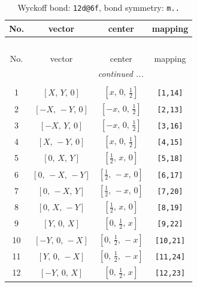 \documentclass[fleqn,8pt]{jsarticle}
\begin{document}
\begin{longtable}{cccc}
\caption{Wyckoff bond: {\tt 12d@6f}, bond symmetry: {\tt m..}}
 \\
 \hline \hline
No. & vector & center & mapping \\ \hline \endfirsthead

\multicolumn{3}{l}{\tablename\ \thetable{}} \\
 \hline \hline
No. & vector & center & mapping \\ \hline \endhead

 \hline \hline
\multicolumn{3}{r}{\footnotesize\it continued ...} \\ \endfoot

 \hline \hline
\multicolumn{3}{r}{} \\ \endlastfoot

1 & $\left[ X,\, Y,\, 0 \right]$ & $\left[ x,\, 0,\, \frac{1}{2} \right]$ & {\tt [1,14]} \\ \hline
2 & $\left[ - X,\, - Y,\, 0 \right]$ & $\left[ - x,\, 0,\, \frac{1}{2} \right]$ & {\tt [2,13]} \\ \hline
3 & $\left[ - X,\, Y,\, 0 \right]$ & $\left[ - x,\, 0,\, \frac{1}{2} \right]$ & {\tt [3,16]} \\ \hline
4 & $\left[ X,\, - Y,\, 0 \right]$ & $\left[ x,\, 0,\, \frac{1}{2} \right]$ & {\tt [4,15]} \\ \hline
5 & $\left[ 0,\, X,\, Y \right]$ & $\left[ \frac{1}{2},\, x,\, 0 \right]$ & {\tt [5,18]} \\ \hline
6 & $\left[ 0,\, - X,\, - Y \right]$ & $\left[ \frac{1}{2},\, - x,\, 0 \right]$ & {\tt [6,17]} \\ \hline
7 & $\left[ 0,\, - X,\, Y \right]$ & $\left[ \frac{1}{2},\, - x,\, 0 \right]$ & {\tt [7,20]} \\ \hline
8 & $\left[ 0,\, X,\, - Y \right]$ & $\left[ \frac{1}{2},\, x,\, 0 \right]$ & {\tt [8,19]} \\ \hline
9 & $\left[ Y,\, 0,\, X \right]$ & $\left[ 0,\, \frac{1}{2},\, x \right]$ & {\tt [9,22]} \\ \hline
10 & $\left[ - Y,\, 0,\, - X \right]$ & $\left[ 0,\, \frac{1}{2},\, - x \right]$ & {\tt [10,21]} \\ \hline
11 & $\left[ Y,\, 0,\, - X \right]$ & $\left[ 0,\, \frac{1}{2},\, - x \right]$ & {\tt [11,24]} \\ \hline
12 & $\left[ - Y,\, 0,\, X \right]$ & $\left[ 0,\, \frac{1}{2},\, x \right]$ & {\tt [12,23]} \\
\end{longtable}
\end{document}
